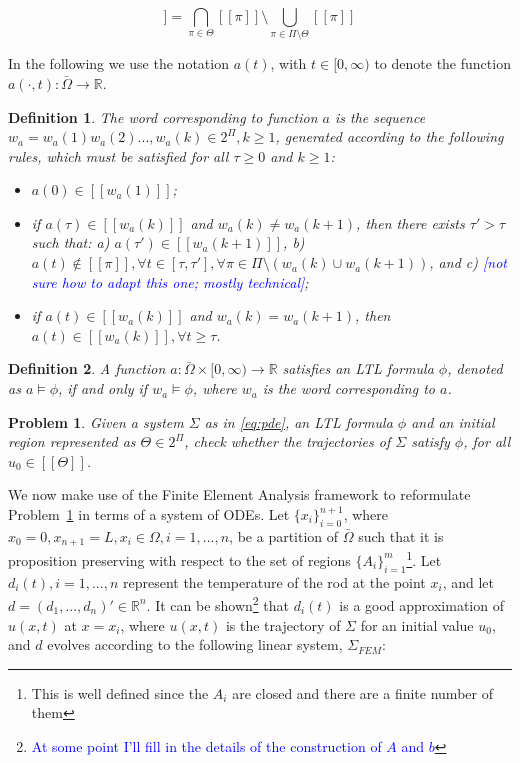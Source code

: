 \documentclass{article}
\newtheorem{definition}{Definition}
\newtheorem{problem}{Problem}
\newcommand*{\R}{\mathbb{R}}
\newcommand*{\psat}[1]{[[#1]]}
\newcommand*{\fran}[1]{\textcolor{blue}{#1}}
\begin{document}
\begin{equation}
    \psat{\Theta} = \bigcap_{\pi \in \Theta} \psat{\pi} \setminus 
    \bigcup_{\pi \in \Pi \setminus \Theta} \psat{\pi}
\end{equation}

In the following we use the notation $a(t)$, with $t \in [0, \infty)$ to denote
the function $a(\cdot , t) : \bar\Omega \rightarrow \R$.

\begin{definition}\label{def:word}
    The word corresponding to function $a$ is the sequence $w_a = w_a(1)
    w_a(2)..., w_a(k) \in 2^\Pi, k \geq 1$, generated according to the following
    rules, which must be satisfied for all $\tau \geq 0$ and $k \geq 1$:

    \begin{itemize}
        \item $a(0) \in \psat{w_a(1)}$;
        \item if $a(\tau) \in \psat{w_a(k)}$ and $w_a(k) \neq w_a(k + 1)$, then
            there exists $\tau' > \tau$ such that: a) $a(\tau') \in \psat{w_a(k
            + 1)}$, b) $a(t) \notin \psat{\pi}, \forall t \in [\tau, \tau'], \forall \pi \in
            \Pi \setminus (w_a(k) \cup w_a(k + 1))$, and c) \fran{[not sure how
            to adapt this one; mostly technical]};
        \item if $a(t) \in \psat{w_a(k)}$ and $w_a(k) = w_a(k + 1)$, then $a(t) \in
        \psat{w_a(k)}, \forall t \geq \tau$.
    \end{itemize}
\end{definition}

\begin{definition}\label{def:sat}
    A function $a : \bar \Omega \times [0, \infty) \rightarrow \R$ satisfies an
        LTL formula $\phi$, denoted as $a \models \phi$, if and only if $w_a
        \models \phi$, where $w_a$ is the word corresponding to $a$.
\end{definition}

\begin{problem}\label{pr:pde}
    Given a system $\Sigma$ as in \eqref{eq:pde}, an LTL formula $\phi$ and an
    initial region represented as $\Theta \in 2^\Pi$, check whether the trajectories of $\Sigma$
    satisfy $\phi$, for all $u_0 \in \psat{\Theta}$.
\end{problem}

We now make use of the Finite Element Analysis framework to reformulate
Problem~\ref{pr:pde} in terms of a system of ODEs. Let $\{x_i\}_{i = 0}^{n +
1}$, where $x_0 = 0, x_{n+1} = L, x_i \in \Omega, i = 1,...,n$, be a partition of
$\bar\Omega$ such that it is proposition preserving with respect to the set of
regions $\{A_i\}_{i = 1}^{m}$\footnote{This is well defined since the $A_i$ are
closed and there are a finite number of them}. Let $d_i(t), i = 1,...,n$ represent the
temperature of the rod at the point $x_i$, and let $d = (d_1, ..., d_n)' \in
\R^n$. It can be shown\footnote{\fran{At some point I'll fill in the details of the
construction of $A$ and $b$}} that $d_i(t)$ is a good approximation of 
$u(x, t)$ at $x=x_i$, where $u(x,t)$ is the trajectory of $\Sigma$ for an
initial value $u_0$, and $d$ evolves
according to the following linear system, $\Sigma_{FEM}$:
\end{document}
